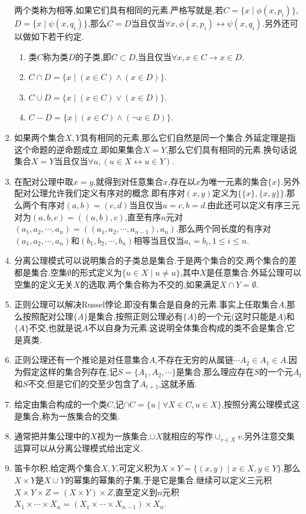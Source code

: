 \begin{enumerate}
	两个类称为相等,如果它们具有相同的元素.严格写就是,若$C=\{x\mid \phi(x,p_i)\}$,$D=\{x\mid\psi(x,q_i)\}$,那么$C=D$当且仅当$\forall x,\phi(x,p_i)\leftrightarrow \psi(x,q_i)$.另外还可以做如下若干约定.
	\begin{enumerate}
		\item 类$C$称为类$D$的子类,即$C\subset D$,当且仅当$\forall x,x\in C\rightarrow x\in D$.
		\item $C\cap D=\{x\mid (x\in C)\wedge(x\in D)\}$.
		\item $C\cup D=\{x\mid (x\in C)\vee(x\in D)\}$.
		\item $C-D=\{x\mid (x\in C)\wedge(\neg x\in D)\}$.
	\end{enumerate}
	\item 如果两个集合$X,Y$具有相同的元素,那么它们自然是同一个集合.外延定理是指这个命题的逆命题成立,即如果集合$X=Y$,那么它们具有相同的元素.换句话说集合$X=Y$当且仅当$\forall u,(u\in X\leftrightarrow u\in Y)$.
	\item 在配对公理中取$x=y$,就得到对任意集合$x$,存在以$x$为唯一元素的集合$\{x\}$.另外配对公理允许我们定义有序对的概念.即有序对$(x,y)$定义为$\{\{x\},\{x,y\}\}$.那么两个有序对$(a,b)=(c,d)$当且仅当$a=c,b=d$.由此还可以定义有序三元对为$(a,b,c)=((a,b),c)$,直至有序$n$元对$(a_1,a_2,\cdots,a_n)=((a_1,a_2,\cdots,a_{n-1}),a_n)$.那么两个同长度的有序对$(a_1,a_2,\cdots,a_n)$和$(b_1,b_2,\cdots,b_n)$相等当且仅当$a_i=b_i,1\le i\le n$.
	\item 分离公理模式可以说明集合的子类总是集合.于是两个集合的交,两个集合的差都是集合.空集$\emptyset$的形式定义为$\{u\in X\mid u\not=u\}$,其中$X$是任意集合.外延公理可以空集的定义无关$X$的选取.两个集合称为不交的,如果满足$X\cap Y=\emptyset$.
	\item 正则公理可以解决Russel悖论,即没有集合是自身的元素.事实上任取集合$A$,那么按照配对公理$\{A\}$是集合,按照正则公理必有$\{A\}$的一个元(这时只能是$A$)和$\{A\}$不交,也就是说$A$不以自身为元素.这说明全体集合构成的类不会是集合,它是真类.
	\item 正则公理还有一个推论是对任意集合$A$,不存在无穷的从属链$\cdots A_2\in A_1\in A$.因为假定这样的集合列存在,记$S=\{A_1,A_2,\cdots\}$是集合,那么理应存在$S$的一个元$A_t$和$S$不交,但是它们的交至少包含了$A_{t+1}$,这就矛盾.
	\item 给定由集合构成的一个类$C$,记$\cap C=\{u\mid \forall X\in C,u\in X\}$,按照分离公理模式这是集合,称为一族集合的交集.
	\item 通常把并集公理中的$X$视为一族集合,$\cup X$就相应的写作$\cup_{v\in X}v$.另外注意交集运算可以从分离公理模式给出定义.
	\item 笛卡尔积.给定两个集合$X,Y$,可定义积为$X\times Y=\{(x,y)\mid x\in X,y\in Y\}$.那么$X\times Y$是$X\cup Y$的幂集的幂集的子集,于是它是集合.继续可以定义三元积$X\times Y\times Z=(X\times Y)\times Z$,直至定义到$n$元积$X_1\times\cdots\times X_n=(X_1\times\cdots\times X_{n-1})\times X_n$.

\end{enumerate}
